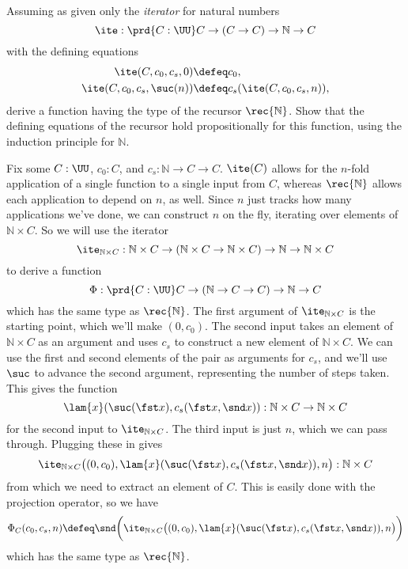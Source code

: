   Assuming as given only the \emph{iterator} for natural numbers
\[
  \ite : 
  \prd{C:\UU} C \to (C \to C) \to \mathbb{N} \to C
\]                                                        
with the defining equations
\begin{align*}
  \ite(C, c_{0}, c_{s}, 0) &\defeq c_{0}, \\
  \ite(C, c_{0}, c_{s}, \suc(n)) &\defeq c_{s}(\ite(C, c_{0}, c_{s}, n)),
\end{align*}
derive a function having the type of the recursor $\rec{\mathbb{N}}$.  Show
that the defining equations of the recursor hold propositionally for this
function, using the induction principle for $\mathbb{N}$.

\soln  Fix some $C :
\UU$, $c_{0} : C$, and $c_{s} : \mathbb{N} \to C \to C$.
$\ite(C)$ allows for the $n$-fold application of a single function to a single
input from $C$, whereas $\rec{\mathbb{N}}$ allows each application to
depend on $n$, as well.  Since $n$ just tracks how many applications we've
done, we can construct $n$ on the fly, iterating over elements of $\mathbb{N}
\times C$.  So we will use the iterator
\[
  \ite_{\mathbb{N} \times C} : \mathbb{N} \times C \to (\mathbb{N} \times C
  \to \mathbb{N} \times C) \to \mathbb{N} \to \mathbb{N} \times C
\]
to derive a function
\[
  \Phi : \prd{C : \UU} C \to (\mathbb{N} \to C \to C) \to
  \mathbb{N} \to C
\]
which has the same type as $\rec{\mathbb{N}}$.
The first argument of $\ite_{\mathbb{N} \times C}$ is the starting point,
which we'll make $(0, c_{0})$.  The second input takes an element of
$\mathbb{N} \times C$ as an argument and uses $c_{s}$ to construct a new
element of $\mathbb{N} \times C$.  We can use the first and second elements of
the pair as arguments for $c_{s}$, and we'll use $\suc$ to advance the second
argument, representing the number of steps taken.  This gives the function
\[
  \lam{x}(\suc(\fst x), c_{s}(\fst x, \snd x)) 
  : \mathbb{N} \times C \to \mathbb{N} \times C
\]
for the second input to $\ite_{\mathbb{N} \times C}$.  The third input is just
$n$, which we can pass through.  Plugging these in gives
\[
  \ite_{\mathbb{N} \times C}\big(
  (0, c_{0}),
  \lam{x}(\suc(\fst x), c_{s}(\fst x, \snd x)),
  n
  \big)
  : \mathbb{N} \times C
\]
from which we need to extract an element of $C$.  This is easily done with the
projection operator, so we have
\[
  \Phi_{C}(c_{0}, c_{s}, n) \defeq
  \snd\bigg(
    \ite_{\mathbb{N} \times C}\big(
    (0, c_{0}),
    \lam{x}(\suc(\fst x), c_{s}(\fst x, \snd x)),
    n
    \big)
  \bigg)
\]
which has the same type as $\rec{\mathbb{N}}$.

